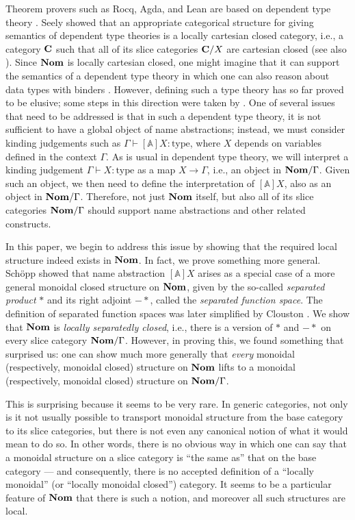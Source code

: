 \documentclass[11pt,a4paper]{amsart}
\theoremstyle{plain}
\theoremstyle{definition}
\theoremstyle{remark}
\newcommand{\Nom}{\textrm{\bf Nom}}
\newcommand{\Cc}{\textrm{\bf{C}}}
\newcommand{\aA}{\mathbb{A}}
\newcommand{\magicwand}{\mathbin{-\!*}}
\newcommand{\type}{\text{type}}
\begin{document}
Theorem provers such as Rocq, Agda, and Lean are based on dependent
type theory {\cite{rocq,agda,lean}}. Seely showed that an appropriate
categorical structure for giving semantics of dependent type theories
is a locally cartesian closed category, i.e., a category $\Cc$ such
that all of its slice categories $\Cc/X$ are cartesian closed
{\cite{Seely1984}} (see also \cite{Clairambault2014}).  Since $\Nom$
is locally cartesian closed, one might imagine that it can support the
semantics of a dependent type theory in which one can also reason
about data types with binders \cite{Pitts2013}. However, defining such
a type theory has so far proved to be elusive; some steps in this
direction were taken by
{\cite{Cheney2012,Pitts2015,Fairweather_et_al2015,VanMuylder_et_al2025}}. One
of several issues that need to be addressed is that in such a
dependent type theory, it is not sufficient to have a global object of
name abstractions; instead, we must consider kinding judgements such
as $\Gamma\vdash [\aA]X : \type$, where $X$ depends on variables
defined in the context $\Gamma$.  As is usual in dependent type
theory, we will interpret a kinding judgement $\Gamma \vdash X :
\type$ as a map $X\to\Gamma$, i.e., an object in $\Nom/\Gamma$. Given
such an object, we then need to define the interpretation of $[\aA]X$,
also as an object in $\Nom/\Gamma$.  Therefore, not just $\Nom$
itself, but also all of its slice categories $\Nom/\Gamma$ should
support name abstractions and other related constructs.

In this paper, we begin to address this issue by showing that the
required local structure indeed exists in $\Nom$. In fact, we prove
something more general. Sch\"opp {\cite{Schopp2006}} showed that name
abstraction $[\aA]X$ arises as a special case of a more general
monoidal closed structure on $\Nom$, given by the so-called
\emph{separated product} $\ast$ and its right adjoint $\magicwand$,
called the \emph{separated function space}. The definition of
separated function spaces was later simplified by Clouston
{\cite{Clouston2013}}. We show that $\Nom$ is \emph{locally
  separatedly closed}, i.e., there is a version of $\ast$ and
$\magicwand$ on every slice category $\Nom/\Gamma$.  However, in
proving this, we found something that surprised us: one can
show much more generally that \emph{every} monoidal (respectively,
monoidal closed) structure on $\Nom$ lifts to a monoidal
(respectively, monoidal closed) structure on $\Nom/\Gamma$.

This is surprising because it seems to be very rare. In generic
categories, not only is it not usually possible to transport monoidal
structure from the base category to its slice categories, but there is
not even any canonical notion of what it would mean to do so. In other
words, there is no obvious way in which one can say that a monoidal
structure on a slice category is ``the same as'' that on the base
category --- and consequently, there is no accepted definition of a
``locally monoidal'' (or ``locally monoidal closed'') category.
It seems to be a particular feature of $\Nom$ that there is such a
notion, and moreover all such structures are local.
\end{document}
